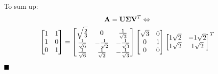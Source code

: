 \documentclass[a4paper]{article}
\numberwithin{equation}{section} %
\newcommand{\qedblack}{$\hfill\blacksquare$} %
\newcommand{\B}[1]{\textbf{\textup{#1}}} %
\begin{document}
\begin{TheSolution}
\[\]
To sum up:
\[
\begin{gathered}
\B{A}=\B{U}\boldsymbol{\Sigma}\B{V}^T \Leftrightarrow\\
\begin{bmatrix}1 & 1\\1& 0\\0 & 1 \end{bmatrix}=
\begin{bmatrix}
\sqrt{\tfrac{2}{3}} & 0 & \tfrac{1}{\sqrt{3}} \\
\tfrac{1}{\sqrt{6}} & -\tfrac{1}{\sqrt{2}} &  -\frac{1}{\sqrt{3}}\\
\tfrac{1}{\sqrt{6}} & \tfrac{1}{\sqrt{2}} & -\tfrac{1}{\sqrt{3}}
\end{bmatrix}
\begin{bmatrix}\sqrt{3} & 0\\0 & 1\\ 0 & 0 \end{bmatrix}
\begin{bmatrix}1\sqrt{2} & -1\sqrt{2}\\1\sqrt{2}& 1\sqrt{2} \end{bmatrix}^T
\end{gathered}
\]
\qedblack\\\end{TheSolution}
\end{document}
